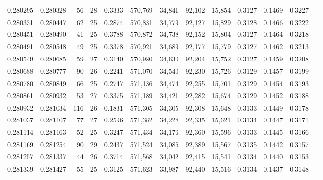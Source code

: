 \begin{tabular}{rrrrrrrrrrrrr}
0.280295 & 0.280328 &  56 &  28 &                                     0.3333 & 570,769 &  34,841 &  92,102 &  15,854 & 0.3127 & 0.1469 & 0.3227 \\
0.280331 & 0.280447 &  62 &  25 &                                     0.2874 & 570,831 &  34,779 &  92,127 &  15,829 & 0.3128 & 0.1466 & 0.3222 \\
0.280451 & 0.280490 &  41 &  25 &                                     0.3788 & 570,872 &  34,738 &  92,152 &  15,804 & 0.3127 & 0.1464 & 0.3218 \\
0.280491 & 0.280548 &  49 &  25 &                                     0.3378 & 570,921 &  34,689 &  92,177 &  15,779 & 0.3127 & 0.1462 & 0.3213 \\
0.280549 & 0.280685 &  59 &  27 &                                     0.3140 & 570,980 &  34,630 &  92,204 &  15,752 & 0.3127 & 0.1459 & 0.3208 \\
0.280688 & 0.280777 &  90 &  26 &                                     0.2241 & 571,070 &  34,540 &  92,230 &  15,726 & 0.3129 & 0.1457 & 0.3199 \\
0.280780 & 0.280849 &  66 &  25 &                                     0.2747 & 571,136 &  34,474 &  92,255 &  15,701 & 0.3129 & 0.1454 & 0.3193 \\
0.280861 & 0.280932 &  53 &  27 &                                     0.3375 & 571,189 &  34,421 &  92,282 &  15,674 & 0.3129 & 0.1452 & 0.3188 \\
0.280932 & 0.281034 & 116 &  26 &                                     0.1831 & 571,305 &  34,305 &  92,308 &  15,648 & 0.3133 & 0.1449 & 0.3178 \\
0.281037 & 0.281107 &  77 &  27 &                                     0.2596 & 571,382 &  34,228 &  92,335 &  15,621 & 0.3134 & 0.1447 & 0.3171 \\
0.281114 & 0.281163 &  52 &  25 &                                     0.3247 & 571,434 &  34,176 &  92,360 &  15,596 & 0.3133 & 0.1445 & 0.3166 \\
0.281169 & 0.281254 &  90 &  29 &                                     0.2437 & 571,524 &  34,086 &  92,389 &  15,567 & 0.3135 & 0.1442 & 0.3157 \\
0.281257 & 0.281337 &  44 &  26 &                                     0.3714 & 571,568 &  34,042 &  92,415 &  15,541 & 0.3134 & 0.1440 & 0.3153 \\
0.281339 & 0.281427 &  55 &  25 &                                     0.3125 & 571,623 &  33,987 &  92,440 &  15,516 & 0.3134 & 0.1437 & 0.3148 \\

\end{tabular}
